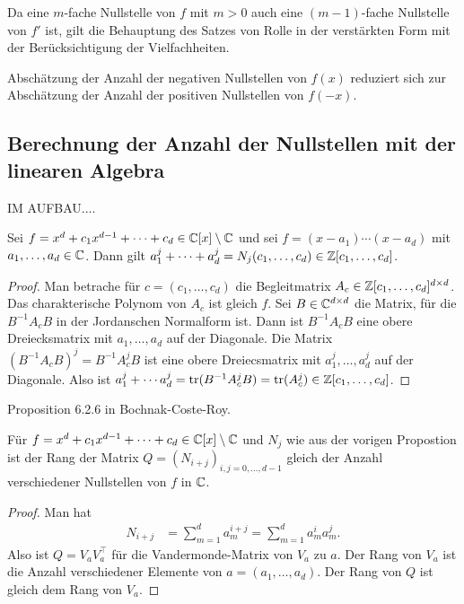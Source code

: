 \documentclass[11pt]{article}
\numberwithin{equation}{section}
\begin{document}
\begin{remark} 
	Da eine $m$-fache Nullstelle von $f$ mit $m>0$ auch eine $(m-1)$-fache Nullstelle von $f'$ ist, gilt die Behauptung des Satzes von Rolle in der verstärkten Form mit der Berücksichtigung der Vielfachheiten. 
\end{remark} 

\begin{remark} 
	Abschätzung der Anzahl der negativen Nullstellen von $f(x)$ reduziert sich zur Abschätzung der Anzahl der positiven Nullstellen von $f(-x)$. 
\end{remark} 

\subsection{Berechnung der Anzahl der Nullstellen mit der linearen Algebra} 

IM AUFBAU.... 

\begin{proposition} 
Sei $f  = x^d + c_1 x^{d-1} + \cdots +  c_d \in \mathbb{C}[x] \setminus \mathbb{C}$ und sei $ f = (x-a_1) \cdots (x-a_d) $ mit $a_1,\ldots,a_d \in \mathbb{C}$. Dann gilt $a_1^j + \cdots + a_d^j = N_j(c_1,\ldots,c_d) \in \mathbb{Z}[c_1,\ldots,c_d]$. 
\end{proposition} 
\begin{proof}
	Man betrache für $c = (c_1,\ldots,c_d)$ die Begleitmatrix $A_c \in \mathbb{Z}[c_1,\ldots,c_d]^{d \times d}$. Das charakterische Polynom von $A_c$ ist gleich $f$. Sei $B \in \mathbb{C}^{d \times d}$ die Matrix, für die $B^{-1} A_c B$ in der Jordanschen Normalform ist. Dann ist $B^{-1} A_c B$ eine obere Dreiecksmatrix mit $a_1,\ldots,a_d$ auf der Diagonale. Die Matrix $(B^{-1} A_c B)^j = B^{-1} A_c^j B$ ist eine obere Dreiecsmatrix mit $a_1^j,\ldots, a_d^j$ auf der Diagonale. Also ist $a_1^j + \cdots a_d^j = \operatorname{tr}(B^{-1} A_c^j B) = \operatorname{tr}(A_c^j) \in \mathbb{Z}[c_1,\ldots,c_d]$. 
\end{proof} 

Proposition 6.2.6 in Bochnak-Coste-Roy.

\begin{theorem} 
	Für $f = x^d + c_1 x^{d-1} + \cdots + c_d \in \mathbb{C}[x] \setminus \mathbb{C}$ und $N_j$ wie aus der vorigen Propostion ist der Rang der Matrix $Q = (N_{i+j})_{i,j=0,\ldots,d-1}$ gleich der Anzahl verschiedener Nullstellen von $f$ in $\mathbb{C}$. 
\end{theorem} 
\begin{proof} 
	Man hat 
	\begin{align*}
			N_{i+j} & = \sum_{m=1}^d a_m^{i+j} = \sum_{m=1}^d a_m^i a_m^j.
	\end{align*}
	Also ist $Q = V_a V_a^\top$ für die Vandermonde-Matrix von $V_a$ zu $a$. Der Rang von $V_a$ ist die Anzahl verschiedener Elemente von $a = (a_1,\ldots,a_d)$. Der Rang von $Q$ ist gleich dem Rang von $V_a$. 
\end{proof} 
\end{document}
